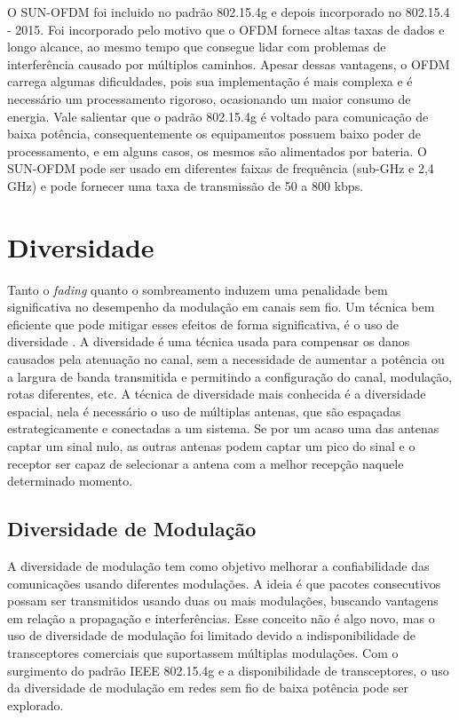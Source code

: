 O SUN-OFDM foi incluido no padrão 802.15.4g e depois incorporado no 802.15.4 - 2015. Foi incorporado pelo motivo que o OFDM fornece 
altas taxas de dados e longo alcance, ao mesmo tempo que  consegue lidar com problemas de interferência causado por múltiplos caminhos. Apesar dessas 
vantagens, o OFDM carrega algumas dificuldades, pois sua implementação é mais complexa e é necessário um processamento rigoroso, ocasionando um maior
consumo de energia. Vale salientar que o padrão 802.15.4g é voltado para comunicação de baixa potência, consequentemente os equipamentos possuem baixo poder de processamento, e em alguns casos, os mesmos são alimentados por bateria. O SUN-OFDM pode ser usado em diferentes faixas de frequência (sub-GHz e 2,4 GHz) e pode fornecer uma taxa de transmissão de 50 a 800 kbps\cite{tuset2020evaluating}.

\section{Diversidade}
\label{sec:diversidade}

Tanto o \textit{fading} quanto o sombreamento induzem uma penalidade bem significativa no desempenho da modulação em canais sem fio. Um técnica bem eficiente que pode mitigar esses efeitos de forma significativa, é o uso de diversidade \cite{goldsmith2005wireless}. A diversidade é uma técnica usada para compensar os danos causados pela atenuação no canal, sem a necessidade de aumentar a potência ou a largura de banda transmitida e permitindo a configuração do canal, modulação, rotas diferentes, etc. A técnica de diversidade mais conhecida é a diversidade espacial\cite{rappaport2009}, nela é necessário o uso de múltiplas antenas, que são espaçadas estrategicamente e conectadas a um sistema. Se por um acaso uma das antenas captar um sinal nulo, as outras antenas podem captar um pico do sinal e o receptor ser capaz de selecionar a antena com a melhor recepção naquele determinado momento. 

\subsection{Diversidade de Modulação} A diversidade de modulação tem como objetivo melhorar a confiabilidade das comunicações usando diferentes modulações. A ideia é que pacotes consecutivos possam ser transmitidos usando duas ou mais modulações, buscando vantagens em relação a propagação e interferências. Esse conceito não é algo novo, mas o uso de diversidade de modulação foi limitado devido a indisponibilidade de transceptores comerciais que suportassem múltiplas modulações. Com o surgimento do padrão IEEE 802.15.4g e a disponibilidade de transceptores, o uso da diversidade de modulação em redes sem fio de baixa potência pode ser explorado. 

